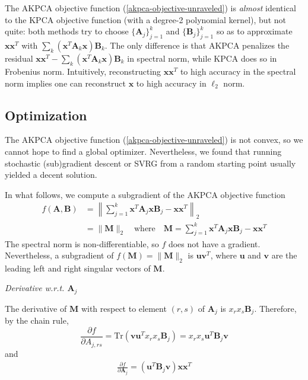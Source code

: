 \documentclass[]{article}
\begin{document}
The AKPCA objective function (\ref{akpca-objective-unraveled}) is \textit{almost} identical to the KPCA objective function (with a degree-2 polynomial kernel), but not quite: both methods try to choose $\{\mathbf{A}_j\}_{j=1}^k$ and $\{\mathbf{B}_j\}_{j=1}^k$ so as to approximate $\mathbf{x} \mathbf{x}^T$ with $\sum_k (\mathbf{x}^T \mathbf{A}_k \mathbf{x}) \mathbf{B}_k$.
The only difference is that AKPCA penalizes the residual  $\mathbf{x} \mathbf{x}^T - \sum_k (\mathbf{x}^T \mathbf{A}_k \mathbf{x}) \mathbf{B}_k$ in spectral norm, while KPCA does so in Frobenius norm.
Intuitively, reconstructing $\mathbf{x} \mathbf{x}^T$ to high accuracy in the spectral norm implies one can reconstruct $\mathbf{x}$ to high accuracy in $\ell_2$ norm.

\subsection{Optimization}

The AKPCA objective function (\ref{akpca-objective-unraveled}) is not convex, so we cannot hope to find a global optimizer.
Nevertheless, we found that running stochastic (sub)gradient descent or SVRG \cite{johnson2013} from a random starting point usually yielded a decent solution.

In what follows, we compute a subgradient of the AKPCA objective function
\begin{align*}
f(\mathbf{A}, \mathbf{B}) &= \left \| \sum_{j=1}^k \mathbf{x}^T \mathbf{A}_j \mathbf{x} \mathbf{B}_j  - \mathbf{x} \mathbf{x}^T \right \|_2 \\
&= \| \mathbf{M} \|_2 \quad \text{where} \quad \mathbf{M} =  \sum_{j=1}^k \mathbf{x}^T \mathbf{A}_j \mathbf{x} \mathbf{B}_j  - \mathbf{x} \mathbf{x}^T 
\end{align*}
The spectral norm is non-differentiable, so $f$ does not have a gradient.
Nevertheless, a subgradient of $f(\mathbf{M}) = \|\mathbf{M}\|_2$ is $\mathbf{u} \mathbf{v}^T$, where $\mathbf{u}$ and $\mathbf{v}$ are the leading left and right singular vectors of $\mathbf{M}$.

\textit{Derivative w.r.t. $\mathbf{A}_j$}

The derivative of $\mathbf{M}$ with respect to element $(r, s)$ of $\mathbf{A}_j$ is $x_r x_s \mathbf{B}_j$.
Therefore, by the chain rule,
$$ \frac{\partial f}{\partial A_{j, rs}} = \text{Tr}(\mathbf{v} \mathbf{u}^T x_r x_s \mathbf{B}_j) = x_r x_s \mathbf{u}^T \mathbf{B}_j \mathbf{v}$$
and
\begin{align}
\label{grad-a}
 \frac{\partial f}{\partial \mathbf{A}_j} = (\mathbf{u}^T \mathbf{B}_j \mathbf{v}) \mathbf{x} \mathbf{x}^T 
\end{align}
\end{document}
